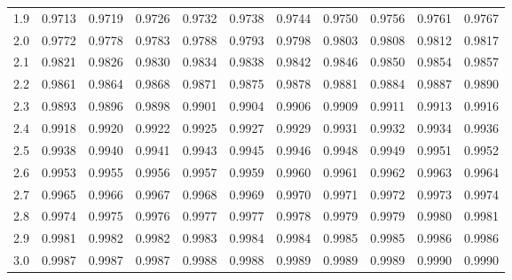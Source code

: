 \begin{minipage}{18cm}
\begin{tabular}{|r|rrrrrrrrrr|}
1.9&0.9713&0.9719&0.9726&0.9732&0.9738&0.9744&0.9750&0.9756&0.9761&0.9767\\
2.0&0.9772&0.9778&0.9783&0.9788&0.9793&0.9798&0.9803&0.9808&0.9812&0.9817\\
2.1&0.9821&0.9826&0.9830&0.9834&0.9838&0.9842&0.9846&0.9850&0.9854&0.9857\\
2.2&0.9861&0.9864&0.9868&0.9871&0.9875&0.9878&0.9881&0.9884&0.9887&0.9890\\
2.3&0.9893&0.9896&0.9898&0.9901&0.9904&0.9906&0.9909&0.9911&0.9913&0.9916\\
2.4&0.9918&0.9920&0.9922&0.9925&0.9927&0.9929&0.9931&0.9932&0.9934&0.9936\\
2.5&0.9938&0.9940&0.9941&0.9943&0.9945&0.9946&0.9948&0.9949&0.9951&0.9952\\
2.6&0.9953&0.9955&0.9956&0.9957&0.9959&0.9960&0.9961&0.9962&0.9963&0.9964\\
2.7&0.9965&0.9966&0.9967&0.9968&0.9969&0.9970&0.9971&0.9972&0.9973&0.9974\\
2.8&0.9974&0.9975&0.9976&0.9977&0.9977&0.9978&0.9979&0.9979&0.9980&0.9981\\
2.9&0.9981&0.9982&0.9982&0.9983&0.9984&0.9984&0.9985&0.9985&0.9986&0.9986\\
3.0&0.9987&0.9987&0.9987&0.9988&0.9988&0.9989&0.9989&0.9989&0.9990&0.9990\\
\hline
\end{tabular}
    \end{minipage}

